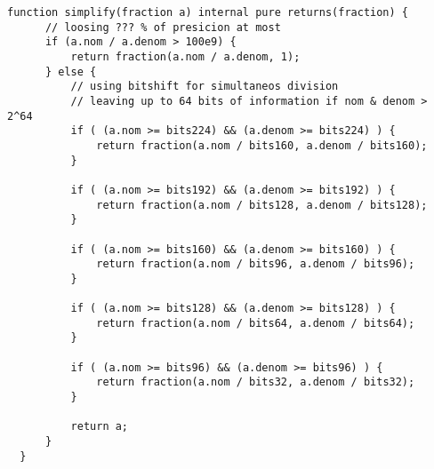 \begin{lstlisting}[firstnumber=69]
  function simplify(fraction a) internal pure returns(fraction) {
      // loosing ??? % of presicion at most
      if (a.nom / a.denom > 100e9) {
          return fraction(a.nom / a.denom, 1);
      } else {
          // using bitshift for simultaneos division
          // leaving up to 64 bits of information if nom & denom > 2^64
          if ( (a.nom >= bits224) && (a.denom >= bits224) ) {
              return fraction(a.nom / bits160, a.denom / bits160);
          }

          if ( (a.nom >= bits192) && (a.denom >= bits192) ) {
              return fraction(a.nom / bits128, a.denom / bits128);
          }

          if ( (a.nom >= bits160) && (a.denom >= bits160) ) {
              return fraction(a.nom / bits96, a.denom / bits96);
          }

          if ( (a.nom >= bits128) && (a.denom >= bits128) ) {
              return fraction(a.nom / bits64, a.denom / bits64);
          }

          if ( (a.nom >= bits96) && (a.denom >= bits96) ) {
              return fraction(a.nom / bits32, a.denom / bits32);
          }

          return a;
      }
  }
\end{lstlisting}

